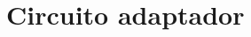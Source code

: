 \documentclass[english,american,fontsize=11pt,paper=a4,BCOR=5mm,twoside,openright,cleardoublepage=empty,titlepage,numbers=noenddot,headinclude=true,footinclude=true]{scrreprt}
\begin{document}
\chapter{Circuito adaptador}


\end{document}
